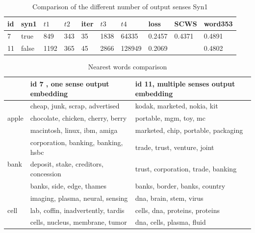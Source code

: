 \begin{table}[tb]

\caption{Comparison of the different number of output senses Syn1} \label{tab:group5} 
\begin{center}
\begin{tabular}{|l|l|l|l|l|l|l|l|l|l|}
\hline
id& syn1 & $t1$ & $t2$ & iter & $t3$ & $t4$ &    loss  & 	SCWS & 	word353	   \\ 
\hline
7	& true		& 849	& 343	& 35	& 1838 &	64335 & 0.2457 &0.4371	&0.4891	   \\ 
\hline
11 	& false		& 1192	& 365	& 45	& 2866 &	128949 & 0.2069 & & 0.4802  \\ 
\hline
\end{tabular}
\end{center}
\end{table}
 

\begin{table}[tb]
\caption{Nearest words comparison} \label{tab:nearestcompare} 

\begin{center}
\begin{tabular}{ |l|l|l| }
\hline
 & id 7 , one sense output embedding& id 11, multiple senses output embedding \\
\hline
\hline
\multirow{3}{*}{apple} 
 & cheap, junk, scrap, advertised 				& kodak, marketed, nokia, kit \\
 & chocolate, chicken, cherry, berry 		& portable, mgm, toy, mc \\
 & macintosh, linux, ibm, amiga			& marketed, chip, portable, packaging \\ 
 \hline
\multirow{3}{*}{bank} 
 & corporation, banking, banking, hsbc & trade, trust, venture, joint \\
 & deposit, stake, creditors, concession & trust, corporation, trade, banking \\ 
 & banks, side, edge, thames &  banks, border, banks, country \\ 
 \hline
\multirow{3}{*}{cell} 
 & imaging, plasma, neural, sensing & dna, brain, stem, virus \\
 & lab, coffin, inadvertently, tardis & cells, dna, proteins, proteins \\
 & cells, nucleus, membrane, tumor & dna, cells, plasma, fluid \\
\hline
\end{tabular}
\end{center}
\end{table}

